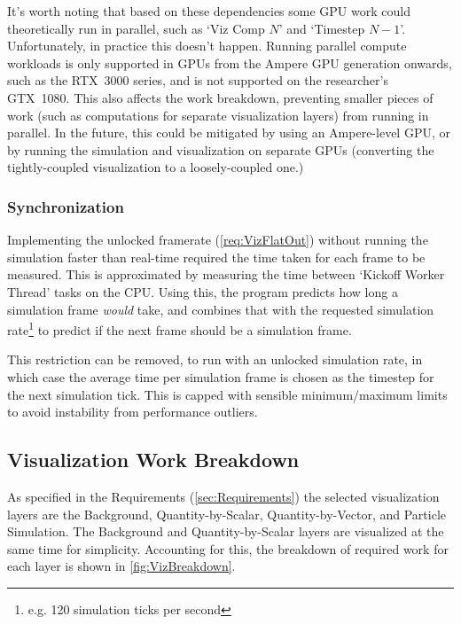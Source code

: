 It's worth noting that based on these dependencies some GPU work could theoretically run in parallel, such as `Viz Comp $N$' and `Timestep $N-1$'.
Unfortunately, in practice this doesn't happen.
Running parallel compute workloads is only supported in GPUs from the Ampere GPU generation onwards\cite{nvidiaAmpereWhitepaper}, such as the RTX~3000 series, and is not supported on the researcher's GTX~1080.
This also affects the work breakdown, preventing smaller pieces of work (such as computations for separate visualization layers) from running in parallel.
In the future, this could be mitigated by using an Ampere-level GPU, or by running the simulation and visualization on separate GPUs (converting the tightly-coupled visualization to a loosely-coupled one.)

\subsubsection{Synchronization}
Implementing the unlocked framerate (\cref{req:VizFlatOut}) without running the simulation faster than real-time required the time taken for each frame to be measured.
This is approximated by measuring the time between `Kickoff Worker Thread' tasks on the CPU.
Using this, the program predicts how long a simulation frame \emph{would} take, and combines that with the requested simulation rate\footnote{e.g. 120 simulation ticks per second} to predict if the next frame should be a simulation frame.

This restriction can be removed, to run with an unlocked simulation rate, in which case the average time per simulation frame is chosen as the timestep for the next simulation tick.
This is capped with sensible minimum/maximum limits to avoid instability from performance outliers.


\subsection{Visualization Work Breakdown}\label{sec:Design:Viz:Breakdown}
As specified in the Requirements (\cref{sec:Requirements}) the selected visualization layers are the Background, Quantity-by-Scalar, Quantity-by-Vector, and Particle Simulation.
The Background and Quantity-by-Scalar layers are visualized at the same time for simplicity.
Accounting for this, the breakdown of required work for each layer is shown in \cref{fig:VizBreakdown}.

